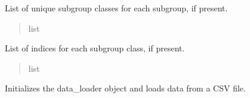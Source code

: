\documentclass[letterpaper,10pt,english]{sphinxmanual}
\begin{document}
\begin{fulllineitems}
\begin{fulllineitems}
\end{fulllineitems}


\begin{fulllineitems}
\label{\detokenize{calzone:calzone.utils.data_loader.subgroups_class}}
\pysigstartsignatures
{}
\pysigstopsignatures
\sphinxAtStartPar
List of unique subgroup classes for each subgroup, if present.
\begin{quote}\begin{description}
\sphinxAtStartPar
list

\end{description}\end{quote}

\end{fulllineitems}


\begin{fulllineitems}
\label{\detokenize{calzone:calzone.utils.data_loader.subgroups_index}}
\pysigstartsignatures
{}
\pysigstopsignatures
\sphinxAtStartPar
List of indices for each subgroup class, if present.
\begin{quote}\begin{description}
\sphinxAtStartPar
list

\end{description}\end{quote}

\end{fulllineitems}


\begin{fulllineitems}
\label{\detokenize{calzone:calzone.utils.data_loader.__init__}}
\pysigstartsignatures
{}
\pysigstopsignatures
\sphinxAtStartPar
Initializes the data\_loader object and loads data from a CSV file.


\end{fulllineitems}
\end{fulllineitems}
\end{document}
